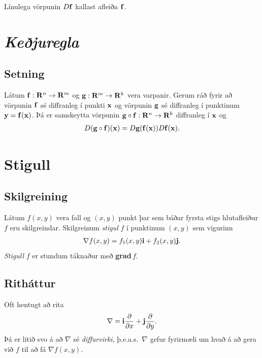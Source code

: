 \documentclass[a4paper,10pt,icelandic]{sphinxmanual}
\begin{document}
Línulega vörpunin \(D\mbox{${\bf f}$}\) kallast afleiða
\(\mbox{${\bf f}$}\).


\section{\textit{Keðjuregla}}
\label{Kafli2:id40}

\subsection{Setning}
\label{Kafli2:id41}
Látum
\(\mbox{${\bf f}$}:\mbox{${\bf R}^n$}\rightarrow \mbox{${\bf R}^m$}\)
og
\(\mbox{${\bf g}$}:\mbox{${\bf R}^m$}\rightarrow \mbox{${\bf R}^k$}\)
vera varpanir. Gerum ráð fyrir að vörpunin \(\mbox{${\bf f}$}\) sé
diffranleg í punkti \(\mbox{${\bf x}$}\) og vörpunin
\(\mbox{${\bf g}$}\) sé diffranleg í punktinum
\(\mbox{${\bf y}$}=\mbox{${\bf f}$}(\mbox{${\bf x}$})\). Þá er
samskeytta vörpunin
\(\mbox{${\bf g}$}\circ\mbox{${\bf f}$}:\mbox{${\bf R}^n$}\rightarrow\mbox{${\bf R}^k$}\)
diffranleg í \(\mbox{${\bf x}$}\) og
\begin{gather}
\begin{split}\displaystyle D(\mbox{${\bf g}$}\circ\mbox{${\bf f}$})(\mbox{${\bf x}$})=D\mbox{${\bf g}$}(\mbox{${\bf f}$}(\mbox{${\bf x}$}))D\mbox{${\bf f}$}(\mbox{${\bf x}$}).\end{split}\notag
\end{gather}

\section{Stigull}
\label{Kafli2:stigull}\label{Kafli2:index-21}

\subsection{Skilgreining}
\label{Kafli2:id42}
Látum \(f(x,y)\) vera fall og \((x,y)\) punkt þar sem báðar
fyrsta stigs hlutafleiður \(f\) eru skilgreindar. Skilgreinum
\textit{stigul} \(f\) í punktinum \((x,y)\) sem vigurinn
\begin{gather}
\begin{split}\displaystyle \nabla f(x,y)=f_1(x,y)\mbox{${\bf i}$}+f_2(x,y)\mbox{${\bf j}$}.\end{split}\notag
\end{gather}
\textit{Stigull} \(f\) er stundum táknaður með \textbf{grad}\(\,f\).


\subsection{Ritháttur}
\label{Kafli2:id43}
Oft hentugt að rita
\begin{gather}
\begin{split}\displaystyle \nabla=\mbox{${\bf i}$}\frac{\partial}{\partial x}+ \mbox{${\bf j}$}\frac{\partial}{\partial y}.\end{split}\notag
\end{gather}
Þá er litið svo á að \(\nabla\) sé \textit{diffurvirki},
þ.e.a.s. \(\nabla\) gefur fyrirmæli um hvað á að gera við
\(f\) til að fá \(\nabla f(x,y)\).
\end{document}
